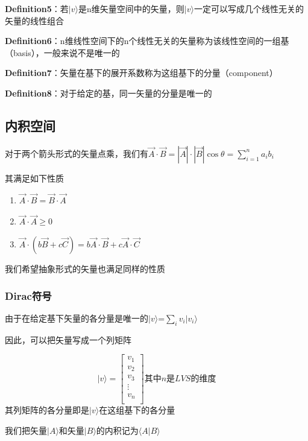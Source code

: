 \documentclass[lang=cn,10pt]{elegantbook}
\begin{document}
 \textbf{Definition5}：若$|v\rangle$是n维矢量空间中的矢量，则$|v\rangle$一定可以写成几个线性无关的矢量的线性组合
 
\textbf{Definition6}：n维线性空间下的n个线性无关的矢量称为该线性空间的一组基（basis），一般来说不是唯一的

\textbf{Definition7}：矢量在基下的展开系数称为这组基下的分量（component）

\textbf{Definition8}：对于给定的基，同一矢量的分量是唯一的
\subsection{内积空间}

对于两个箭头形式的矢量点乘，我们有$\overrightarrow{A}\cdot \overrightarrow{B}=|\overrightarrow{A}|\cdot |\overrightarrow{B}|\cos \theta =\sum_{i=1}^n{a_ib_i}
$

其满足如下性质
\begin{enumerate}
	\item $\overrightarrow{A}\cdot \overrightarrow{B}=\overrightarrow{B}\cdot \overrightarrow{A}$
	\item $\overrightarrow{A}\cdot \overrightarrow{A}\ge 0$
	\item $\overrightarrow{A}\cdot \left( b\overrightarrow{B}+c\overrightarrow{C} \right) =b\overrightarrow{A}\cdot \overrightarrow{B}+c\overrightarrow{A}\cdot \overrightarrow{C}
	$
\end{enumerate}

我们希望抽象形式的矢量也满足同样的性质

\subsubsection{Dirac符号}
由于在给定基下矢量的各分量是唯一的$|v\rangle$=$\sum_{i}v_i|v_i\rangle$

因此，可以把矢量写成一个列矩阵

\begin{equation}
	|v\rangle =\left[ \begin{array}{c}
		v_1\\
		v_2\\
		v_3\\
		\vdots\\
		v_n\\
	\end{array} \right] \text{其中}n\text{是}LVS\text{的维度}
\end{equation}
其列矩阵的各分量即是$|v\rangle$在这组基下的各分量

我们把矢量$|A\rangle$和矢量$|B\rangle$的内积记为$\langle A|B\rangle $
\end{document}
